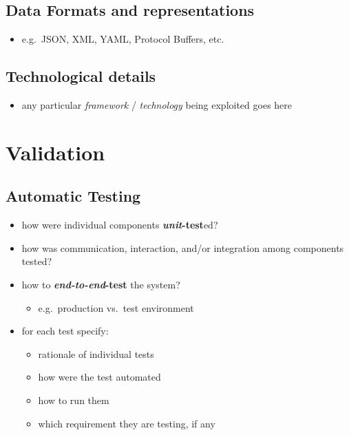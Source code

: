 \documentclass{scrartcl}
\begin{document}
\subsection{Data Formats and representations}\label{data-formats}

\begin{itemize}
  \item e.g.~JSON, XML, YAML, Protocol Buffers, etc.
\end{itemize}

\subsection{Technological details}\label{technological-details}

\begin{itemize}
  \item any particular \emph{framework} / \emph{technology} being exploited
  goes here
\end{itemize}

\section{Validation}\label{validation}

\subsection{Automatic Testing}\label{automatic-testing}

\begin{itemize}
  \item how were individual components \textbf{\emph{unit}-test}ed?
  \item how was communication, interaction, and/or integration among
  components tested?
  \item how to \textbf{\emph{end-to-end}-test} the system?

  \begin{itemize}
    \item e.g.~production vs.~test environment
  \end{itemize}
  \item for each test specify:

  \begin{itemize}
    \item rationale of individual tests
    \item how were the test automated
    \item how to run them
    \item which requirement they are testing, if any
  \end{itemize}
\end{itemize}
\end{document}
